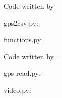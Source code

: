 

Code written by \textcite{Pereira2020}

gps2csv.py:


functions.py:


Code written by \textcite{Borguezani2020}.

gps-read.py:


video.py:
